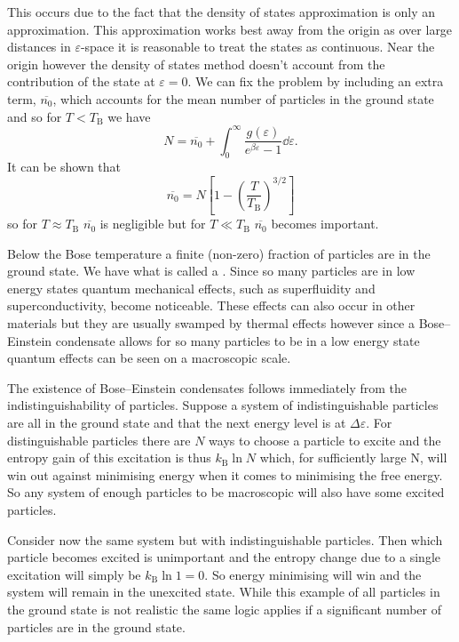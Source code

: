 \documentclass[a4paper]{article}
\newcommand{\boltzmann}{k_\mathrm{B}}
\newcommand{\mean}[1]{\overline{#1}}
\newcommand{\boseTemp}{T_{\mathrm{B}}}
\begin{document}
    This occurs due to the fact that the density of states approximation is only an approximation.
    This approximation works best away from the origin as over large distances in \(\varepsilon\)-space it is reasonable to treat the states as continuous.
    Near the origin however the density of states method doesn't account from the contribution of the state at \(\varepsilon = 0\).
    We can fix the problem by including an extra term, \(\mean{n_0}\), which accounts for the mean number of particles in the ground state and so for \(T < \boseTemp\) we have
    \[N = \mean{n_0} + \int_{0}^{\infty} \frac{g(\varepsilon)}{e^{\beta \varepsilon} - 1}\dd{\varepsilon}.\]
    It can be shown that
    \[\mean{n_0} = N\left[ 1 - \left( \frac{T}{\boseTemp} \right)^{3/2} \right]\]
    so for \(T \approx \boseTemp\) \(\mean{n_0}\) is negligible but for \(T \ll \boseTemp\) \(\mean{n_0}\) becomes important.
    
    Below the Bose temperature a finite (non-zero) fraction of particles are in the ground state.
    We have what is called a .
    Since so many particles are in low energy states quantum mechanical effects, such as superfluidity and superconductivity, become noticeable.
    These effects can also occur in other materials but they are usually swamped by thermal effects however since a Bose--Einstein condensate allows for so many particles to be in a low energy state quantum effects can be seen on a macroscopic scale.
    
    The existence of Bose--Einstein condensates follows immediately from the indistinguishability of particles.
    Suppose a system of indistinguishable particles are all in the ground state and that the next energy level is at \(\Delta\varepsilon\).
    For distinguishable particles there are \(N\) ways to choose a particle to excite and the entropy gain of this excitation is thus \(\boltzmann \ln N\) which, for sufficiently large N, will win out against minimising energy when it comes to minimising the free energy.
    So any system of enough particles to be macroscopic will also have some excited particles.
    
    Consider now the same system but with indistinguishable particles.
    Then which particle becomes excited is unimportant and the entropy change due to a single excitation will simply be \(\boltzmann \ln 1 = 0\).
    So energy minimising will win and the system will remain in the unexcited state.
    While this example of all particles in the ground state is not realistic the same logic applies if a significant number of particles are in the ground state.
    
\end{document}
